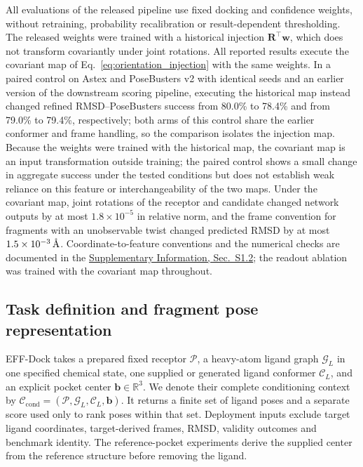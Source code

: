 \documentclass{article}
\newcommand{\method}{EFF-Dock\xspace}
\newcommand{\angstrom}{\text{\normalfont\AA}}
\newcommand{\R}{\mathbb{R}}
\newcommand{\sisection}[1]{\href{SI.pdf}{Supplementary Information, Sec.~#1}}
\begin{document}
All evaluations of the released pipeline use fixed docking and confidence weights, without retraining, probability recalibration or result-dependent thresholding.
The released weights were trained with a historical injection \(\mathbf R^\top\mathbf w\), which does not transform covariantly under joint rotations. All reported results execute the covariant map of Eq.~\eqref{eq:orientation_injection} with the same weights. In a paired control on Astex and PoseBusters v2 with identical seeds and an earlier version of the downstream scoring pipeline, executing the historical map instead changed refined RMSD--PoseBusters success from 80.0\% to 78.4\% and from 79.0\% to 79.4\%, respectively; both arms of this control share the earlier conformer and frame handling, so the comparison isolates the injection map. Because the weights were trained with the historical map, the covariant map is an input transformation outside training; the paired control shows a small change in aggregate success under the tested conditions but does not establish weak reliance on this feature or interchangeability of the two maps. Under the covariant map, joint rotations of the receptor and candidate changed network outputs by at most \(1.8\times10^{-5}\) in relative norm, and the frame convention for fragments with an unobservable twist changed predicted RMSD by at most \(1.5\times10^{-3}\,\angstrom\).
Coordinate-to-feature conventions and the numerical checks are documented in the \sisection{S1.2}; the readout ablation was trained with the covariant map throughout.

\subsection{Task definition and fragment pose representation}
\label{sec:problem}

\method takes a prepared fixed receptor \(\mathcal{P}\), a heavy-atom ligand graph \(\mathcal{G}_{L}\) in one specified chemical state, one supplied or generated ligand conformer \(\mathcal{C}_{L}\), and an explicit pocket center \(\mathbf{b}\in\R^3\).
We denote their complete conditioning context by \(\mathcal{C}_{\mathrm{cond}}=(\mathcal{P},\mathcal{G}_{L},\mathcal{C}_{L},\mathbf{b})\).
It returns a finite set of ligand poses and a separate score used only to rank poses within that set.
Deployment inputs exclude target ligand coordinates, target-derived frames, RMSD, validity outcomes and benchmark identity. The reference-pocket experiments derive the supplied center from the reference structure before removing the ligand.
\end{document}
